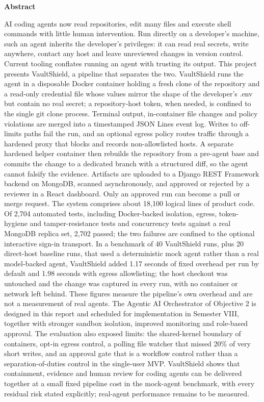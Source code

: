 \documentclass[12pt,a4paper,oneside]{report}
\begin{document}
\thispagestyle{empty}
\vspace*{1.60in}
\begin{center}{\large\bfseries Abstract}\end{center}
\vspace{0.20in}
AI coding agents now read repositories, edit many files and execute shell commands with little human intervention. Run directly on a developer's machine, such an agent inherits the developer's privileges: it can read real secrets, write anywhere, contact any host and leave unreviewed changes in version control. Current tooling conflates running an agent with trusting its output. This project presents VaultShield, a pipeline that separates the two. VaultShield runs the agent in a disposable Docker container holding a fresh clone of the repository and a read-only credential file whose values mirror the shape of the developer's .env but contain no real secret; a repository-host token, when needed, is confined to the single git clone process. Terminal output, in-container file changes and policy violations are merged into a timestamped JSON Lines event log. Writes to off-limits paths fail the run, and an optional egress policy routes traffic through a hardened proxy that blocks and records non-allowlisted hosts. A separate hardened helper container then rebuilds the repository from a pre-agent base and commits the change to a dedicated branch with a structured diff, so the agent cannot falsify the evidence. Artifacts are uploaded to a Django REST Framework backend on MongoDB, scanned asynchronously, and approved or rejected by a reviewer in a React dashboard. Only an approved run can become a pull or merge request. The system comprises about 18,100 logical lines of product code. Of 2,704 automated tests, including Docker-backed isolation, egress, token-hygiene and tamper-resistance tests and concurrency tests against a real MongoDB replica set, 2,702 passed; the two failures are confined to the optional interactive sign-in transport. In a benchmark of 40 VaultShield runs, plus 20 direct-host baseline runs, that used a deterministic mock agent rather than a real model-backed agent, VaultShield added 1.17 seconds of fixed overhead per run by default and 1.98 seconds with egress allowlisting; the host checkout was untouched and the change was captured in every run, with no container or network left behind. These figures measure the pipeline's own overhead and are not a measurement of real agents. The Agentic AI Orchestrator of Objective 2 is designed in this report and scheduled for implementation in Semester VIII, together with stronger sandbox isolation, improved monitoring and role-based approval. The evaluation also exposed limits: the shared-kernel boundary of containers, opt-in egress control, a polling file watcher that missed 20\% of very short writes, and an approval gate that is a workflow control rather than a separation-of-duties control in the single-user MVP. VaultShield shows that containment, evidence and human review for coding agents can be delivered together at a small fixed pipeline cost in the mock-agent benchmark, with every residual risk stated explicitly; real-agent performance remains to be measured.
\end{document}
